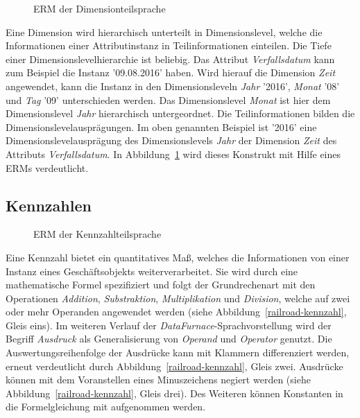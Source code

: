 \documentclass[
  language=german, %
  type=bachelor,%
  ngerman
]{isthesis}
\begin{document}
\begin{content}
  \begin{figure}
    \resizebox{350px}{!}{}
    \caption{\acrshort{ERM} der Dimensionteilsprache}\label{dimension-erm}
  \end{figure}

	Eine Dimension wird hierarchisch unterteilt in Dimensionslevel, welche die
	Informationen einer Attributinstanz in Teilinformationen einteilen. Die Tiefe
	einer Dimensionslevelhierarchie ist beliebig. Das Attribut
	\textit{Verfallsdatum} kann zum Beispiel die Instanz '09.08.2016' haben. Wird
	hierauf die Dimension \textit{Zeit} angewendet, kann die Instanz in den
	Dimensionsleveln \textit{Jahr} '2016', \textit{Monat} '08' und \textit{Tag}
	'09' unterschieden werden. Das Dimensionslevel \textit{Monat} ist hier dem
	Dimensionslevel \textit{Jahr} hierarchisch untergeordnet. Die
	Teilinformationen bilden die Dimensionslevelausprägungen. Im oben genannten
	Beispiel ist '2016' eine Dimensionslevelausprägung des Dimensionslevels
	\textit{Jahr} der Dimension \textit{Zeit} des Attributs
	\textit{Verfallsdatum}. In Abbildung~\ref{dimension-erm} wird dieses
	Konstrukt mit Hilfe eines \acrshort{ERM}s verdeutlicht.

  \subsection{Kennzahlen}

  \begin{figure}
    \resizebox{250px}{!}{}
    \caption{\acrshort{ERM} der Kennzahlteilsprache}\label{kennzahl}
  \end{figure}

	Eine Kennzahl bietet ein quantitatives Maß, welches die Informationen von
	einer Instanz eines Geschäftsobjekts weiterverarbeitet. Sie
	wird durch eine mathematische Formel spezifiziert und folgt der
	Grundrechenart mit den Operationen \textit{Addition}, \textit{Substraktion},
	\textit{Multiplikation} und \textit{Division}, welche auf zwei oder mehr
	Operanden angewendet werden (siehe Abbildung~\ref{railroad-kennzahl}, Gleis
	eins). Im weiteren Verlauf der \textit{DataFurnace}-Sprachvorstellung wird
	der Begriff \textit{Ausdruck} als Generalisierung von \textit{Operand} und
	\textit{Operator} genutzt.  Die Auswertungsreihenfolge der Ausdrücke kann mit
	Klammern differenziert werden, erneut verdeutlicht durch
	Abbildung~\ref{railroad-kennzahl}, Gleis zwei.  Ausdrücke können mit dem
	Voranstellen eines Minuszeichens negiert werden (siehe
	Abbildung~\ref{railroad-kennzahl}, Gleis drei). Des Weiteren können
	Konstanten in die Formelgleichung mit aufgenommen werden.


\end{content}
\end{document}
